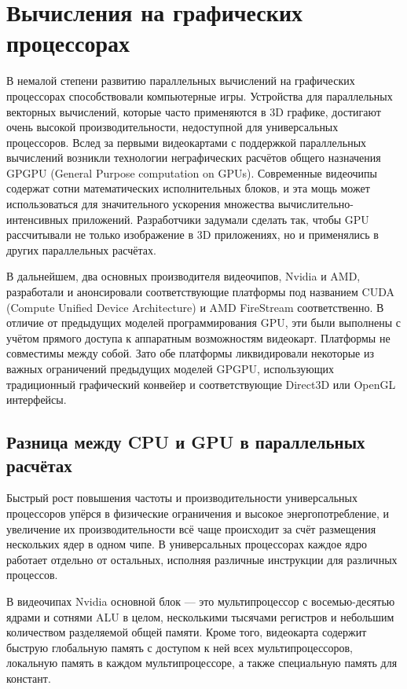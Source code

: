 \section {Вычисления на графических процессорах}

В немалой степени развитию параллельных вычислений на графических процессорах способствовали компьютерные игры. Устройства для параллельных векторных вычислений, которые часто применяются в 3D графике, достигают очень высокой производительности, недоступной для универсальных процессоров. Вслед за первыми видеокартами с поддержкой параллельных вычислений возникли технологии неграфических расчётов общего назначения GPGPU (General Purpose computation on GPUs). Современные видеочипы содержат сотни математических исполнительных блоков, и эта мощь может использоваться для значительного ускорения множества вычислительно-интенсивных приложений. Разработчики задумали сделать так, чтобы GPU рассчитывали не только изображение в 3D приложениях, но и применялись в других параллельных расчётах.

В дальнейшем, два основных производителя видеочипов, Nvidia и AMD, разработали и анонсировали соответствующие платформы под названием CUDA (Compute Unified Device Architecture) и AMD FireStream соответственно. В отличие от предыдущих моделей программирования GPU, эти были выполнены с учётом прямого доступа к аппаратным возможностям видеокарт. Платформы не совместимы между собой. Зато обе платформы ликвидировали некоторые из важных ограничений предыдущих моделей GPGPU, использующих традиционный графический конвейер и соответствующие Direct3D или OpenGL интерфейсы.

\subsection {Разница между CPU и GPU в параллельных расчётах}

Быстрый рост повышения частоты и производительности универсальных процессоров упёрся в физические ограничения и высокое энергопотребление, и увеличение их производительности всё чаще происходит за счёт размещения нескольких ядер в одном чипе. В универсальных процессорах каждое ядро работает отдельно от остальных, исполняя различные инструкции для различных процессов.

В видеочипах Nvidia основной блок — это мультипроцессор с восемью-десятью ядрами и сотнями ALU в целом, несколькими тысячами регистров и небольшим количеством разделяемой общей памяти. Кроме того, видеокарта содержит быструю глобальную память с доступом к ней всех мультипроцессоров, локальную память в каждом мультипроцессоре, а также специальную память для констант.

